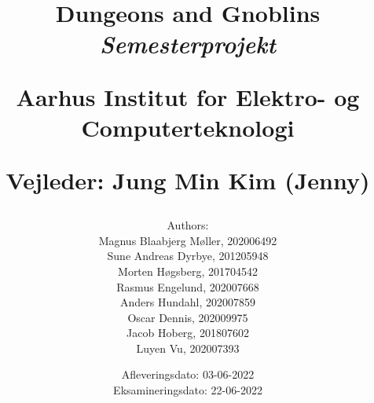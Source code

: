 \newcommand{\authorName}{}
\newcommand{\titleName}{Dungeons and Gnoblins}
\newcommand{\subject}{Semesterprojekt}
\newcommand{\vejleder}{Vejleder: Jung Min Kim (Jenny)}
\newcommand{\institute}{Aarhus Institut for Elektro- og Computerteknologi}
\begin{titlepage}
  \centering
    \title
    {
      \Huge \textbf{\titleName}\\
      \scale{\numberSQRTTWO}{\vspace{\sol pt}}
      \LARGE \textit{\subject}
      \scale{\numberSQRTTWO}{\rule{\linewidth}{\sol pt}}

      \textbf{\institute}

      \vejleder

      \author
    {
      \LARGE Authors: \\
      Magnus Blaabjerg Møller, 202006492 \\
      Sune Andreas Dyrbye, 201205948 \\
      Morten Høgsberg, 201704542 \\
      Rasmus Engelund, 202007668 \\
      Anders Hundahl, 202007859 \\
      Oscar Dennis, 202009975 \\
      Jacob Hoberg, 201807602 \\
      Luyen Vu, 202007393 \\
    }
      \date{
        \LARGE Afleveringsdato: 03-06-2022 \\
        \LARGE Eksamineringsdato: 22-06-2022
      }
    }
\end{titlepage}
